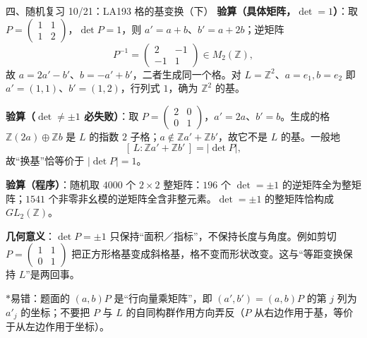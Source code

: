 \documentclass[aspectratio=169,10pt,fontset=none]{ctexbeamer}
\newcommand{\key}[1]{\textcolor{ink}{\bfseries #1}}
\newcommand{\starpt}{\textcolor{accent}{\bfseries$\ast$}}
\begin{document}
\begin{frame}[t]{四、随机复习 10/21：LA193 格的基变换（下）}
\scriptsize
\key{验算（具体矩阵，$\det=1$）}：取 $P=\begin{pmatrix}1&1\\1&2\end{pmatrix}$，$\det P=1$，则 $a'=a+b$、$b'=a+2b$；逆矩阵
\[ P^{-1}=\begin{pmatrix}2&-1\\-1&1\end{pmatrix}\in M_2(\mathbb Z), \]
故 $a=2a'-b'$、$b=-a'+b'$，二者生成同一个格。对 $L=\mathbb Z^2$、$a=e_1,b=e_2$ 即 $a'=(1,1)$、$b'=(1,2)$，行列式 $1$，确为 $\mathbb Z^2$ 的基。

\key{验算（$\det\ne\pm1$ 必失败）}：取 $P=\begin{pmatrix}2&0\\0&1\end{pmatrix}$，$a'=2a$、$b'=b$。生成的格 $\mathbb Z(2a)\oplus\mathbb Z b$ 是 $L$ 的指数 $2$ 子格；$a\notin\mathbb Z a'+\mathbb Z b'$，故它不是 $L$ 的基。一般地
\[ [\,L:\mathbb Za'+\mathbb Zb'\,]=|\det P|, \]
故“换基”恰等价于 $|\det P|=1$。

\key{验算（程序）}：随机取 $4000$ 个 $2\times2$ 整矩阵：$196$ 个 $\det=\pm1$ 的逆矩阵全为整矩阵；$1541$ 个非零非幺模的逆矩阵全含非整元素。$\det=\pm1$ 的整矩阵恰构成 $GL_2(\mathbb Z)$。

\key{几何意义}：$\det P=\pm1$ 只保持“面积／指标”，不保持长度与角度。例如剪切 $P=\begin{pmatrix}1&1\\0&1\end{pmatrix}$ 把正方形格基变成斜格基，格不变而形状改变。这与“等距变换保持 $L$”是两回事。

\starpt 易错：题面的 $(a,b)P$ 是“行向量乘矩阵”，即 $(a',b')=(a,b)P$ 的第 $j$ 列为 $a'_j$ 的坐标；不要把 $P$ 与 $L$ 的自同构群作用方向弄反（$P$ 从右边作用于基，等价于从左边作用于坐标）。
\end{frame}
\end{document}
